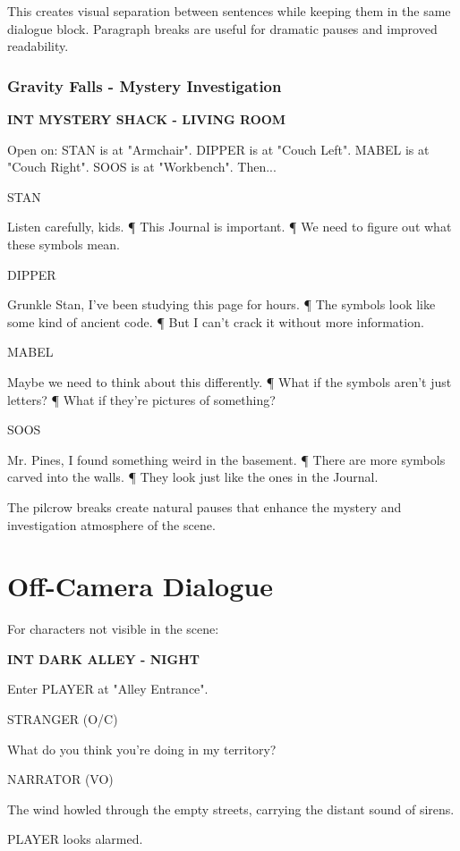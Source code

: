 \documentclass[11pt,letterpaper,oldstylefigures]{memoir}
\newcommand{\slugline}[1]{\nobreak\textbf{\MakeUppercase{#1}}\par\nobreak\vspace{1\baselineskip}}
\newcommand{\speaker}[1]{\nobreak\hspace*{0.333\textwidth}\MakeUppercase{#1}\par\nobreak\vspace{0.5\baselineskip}}
\newcommand{\dialogue}[1]{\nobreak\hspace*{0.25\textwidth}\begin{minipage}{0.5\textwidth}#1\end{minipage}\par\vspace{1\baselineskip}}
\newcommand{\stagedir}[1]{#1\par\vspace{1\baselineskip}}
\newenvironment{FountainExample}
  {\begingroup
  \ttfamily\small
   \setlength{\parindent}{0pt}
  \setlength{\parskip}{0.5em}
  \allowdisplaybreaks
  \setlength{\displaywidowpenalty}{0}
  \setlength{\widowpenalty}{0}
  \setlength{\clubpenalty}{0}
  \setlength{\interlinepenalty}{0}
}
  {\endgroup}
\begin{document}
This creates visual separation between sentences while keeping them in the same dialogue block. Paragraph breaks are useful for dramatic pauses and improved readability.

\subsubsection*{Gravity Falls - Mystery Investigation}
\label{ex:gravity-falls-mystery}

\begin{FountainExample}
\slugline{INT MYSTERY SHACK - LIVING ROOM}

\stagedir{Open on: STAN is at "Armchair". DIPPER is at "Couch Left". MABEL is at "Couch Right". SOOS is at "Workbench". Then...}

\speaker{STAN}
\dialogue{Listen carefully, kids. ¶ This Journal is important. ¶ We need to figure out what these symbols mean.}

\speaker{DIPPER}
\dialogue{Grunkle Stan, I've been studying this page for hours. ¶ The symbols look like some kind of ancient code. ¶ But I can't crack it without more information.}

\speaker{MABEL}
\dialogue{Maybe we need to think about this differently. ¶ What if the symbols aren't just letters? ¶ What if they're pictures of something?}

\speaker{SOOS}
\dialogue{Mr. Pines, I found something weird in the basement. ¶ There are more symbols carved into the walls. ¶ They look just like the ones in the Journal.}
\end{FountainExample}

The pilcrow breaks create natural pauses that enhance the mystery and investigation atmosphere of the scene.

\section{Off-Camera Dialogue}

For characters not visible in the scene:

\begin{FountainExample}
\slugline{INT DARK ALLEY - NIGHT}

\stagedir{Enter PLAYER at "Alley Entrance".}

\speaker{STRANGER (O/C)}
\dialogue{What do you think you're doing in my territory?}

\speaker{NARRATOR (VO)}
\dialogue{The wind howled through the empty streets, carrying the distant sound of sirens.}

\stagedir{PLAYER looks alarmed.}
\end{FountainExample}
\end{document}
